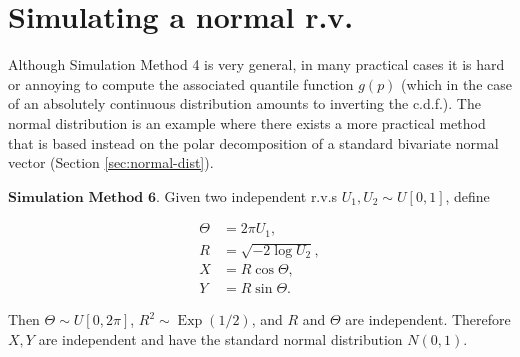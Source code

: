\section{Simulating a normal r.v.}

Although Simulation Method 4 is very general, in many
practical cases it is hard or annoying to compute the
associated quantile function $g(p)$ (which in the
case of an absolutely continuous distribution amounts
to inverting the c.d.f.). The normal distribution is
an example where there exists a more practical method
that is based instead on the polar decomposition of a
standard bivariate normal vector (Section
\ref{sec:normal-dist}).

$\textbf{Simulation Method 6.}$ Given two independent
r.v.s $U_1,U_2 \sim U[0,1]$, define

\begin{align*}
\Theta &= 2\pi U_1, \\
R &= \sqrt{-2 \log U_2}, \\
X &= R\cos \Theta, \\
Y &= R \sin \Theta.
\end{align*}

\noindent Then $\Theta \sim U[0,2\pi]$,
$R^2 \sim \operatorname{Exp}(1/2)$, and $R$ and
$\Theta$ are independent. Therefore $X,Y$ are
independent and have the standard normal distribution
$N(0,1)$.
